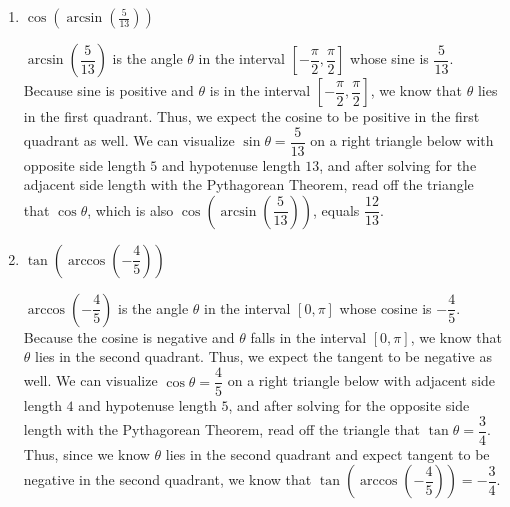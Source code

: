\documentclass{article}
\begin{document}
\begin{enumerate}
\begin{enumerate}
\begin{solution}
 $\arccos\left(-\dfrac{\sqrt{3}}{2}\right)$ is the angle in the interval $[0, \pi]$ whose cosine is $-\dfrac{\sqrt{3}}{2}$, which is $\dfrac{5\pi}{6}$. Next, we compute $\sin\left(\dfrac{5\pi}{6}\right)=\dfrac{1}{2}$. Thus, $\sin\left(\arccos\left(-\dfrac{\sqrt{3}}{2}\right)\right)=\dfrac{1}{2}$.  
\end{solution}
\vfill
      
   
\item $\cos\!\left(\arcsin(\frac{5}{13})\right)$

\begin{solution}
    $\arcsin\left(\dfrac{5}{13}\right)$ is the angle $\theta$ in the interval $\left[-\dfrac{\pi}{2},\dfrac{\pi}{2}\right]$ whose sine is $\dfrac{5}{13}$. Because sine is positive and $\theta$ is in the interval $\left[-\dfrac{\pi}{2},\dfrac{\pi}{2}\right]$, we know that $\theta$ lies in the first quadrant. Thus, we expect the cosine to be positive in the first quadrant as well. We can visualize $\sin \theta=\dfrac{5}{13}$ on a right triangle below with opposite side length $5$ and hypotenuse length $13$, and after solving for the adjacent side length with the Pythagorean Theorem, read off the triangle that $\cos \theta$, which is also $\cos\left(\arcsin\left(\dfrac{5}{13}\right)\right)$, equals $\dfrac{12}{13}$.

    
\end{solution}
\vfill\vfill

\item $\tan\left(\arccos\left(-\dfrac{4}{5}\right)\right)$

    \begin{solution}
    $\arccos\left(-\dfrac{4}{5}\right)$ is the angle $\theta$ in the interval $[0,\pi]$ whose cosine is $-\dfrac{4}{5}$. Because the cosine is negative and $\theta$ falls in the interval $[0,\pi]$, we know that $\theta$ lies in the second quadrant. Thus, we expect the tangent to be negative as well. We can visualize $\cos \theta=\dfrac{4}{5}$ on a right triangle below with adjacent side length $4$ and hypotenuse length $5$, and after solving for the opposite side length with the Pythagorean Theorem, read off the triangle that $\tan \theta=\dfrac{3}{4}$. Thus, since we know $\theta$ lies in the second quadrant and expect tangent to be negative in the second quadrant, we know that $\tan\left(\arccos\left(-\dfrac{4}{5}\right)\right)=-\dfrac{3}{4}$.


\end{solution}
\end{enumerate}
\end{enumerate}
\end{document}
